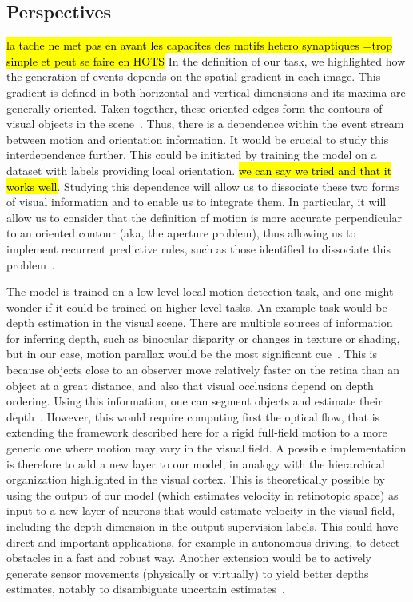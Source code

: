 \documentclass[default]{sn-jnl}%
\theoremstyle{thmstyleone}%
\theoremstyle{thmstyletwo}%
\theoremstyle{thmstylethree}%
\newcommand{\note}[1]{{\sethlcolor{yellow}\hl{#1}}}
\begin{document}
\subsection{Perspectives}
\note{la tache ne met pas en avant les capacites des motifs hetero synaptiques =trop simple et peut se faire en HOTS}
In the definition of our task, we highlighted how the generation of events depends on the spatial gradient in each image. This gradient is defined in both horizontal and vertical dimensions and its maxima are generally oriented. Taken together, these oriented edges form the contours of visual objects in the scene~\citep{koenderink_representation_1987}. Thus, there is a dependence within the event stream between motion and orientation information. It would be crucial to study this interdependence further. This could be initiated by training the model on a dataset with labels providing local orientation. \note{we can say we tried and that it works well}. Studying this dependence will allow us to dissociate these two forms of visual information and to enable us to integrate them. In particular, it will allow us to consider that the definition of motion is more accurate perpendicular to an oriented contour (aka, the aperture problem), thus allowing us to implement recurrent predictive rules, such as those identified to dissociate this problem~\citep{perrinet_motion-based_2012}.

The model is trained on a low-level local motion detection task, and one might wonder if it could be trained on higher-level tasks. An example task would be depth estimation in the visual scene. There are multiple sources of information for inferring depth, such as binocular disparity or changes in texture or shading, but in our case, motion parallax would be the most significant cue~\citep{rogers_motion_1979}. This is because objects close to an observer move relatively faster on the retina than an object at a great distance, and also that visual occlusions depend on depth ordering. Using this information, one can segment objects and estimate their depth~\citep{yoonessi_contribution_2011}. However, this would require computing first the optical flow, that is extending the framework described here for a rigid full-field motion to a more generic one where motion may vary in the visual field. A possible implementation is therefore to add a new layer to our model, in analogy with the hierarchical organization highlighted in the visual cortex. This is theoretically possible by using the output of our model (which estimates velocity in retinotopic space) as input to a new layer of neurons that would estimate velocity in the visual field, including the depth dimension in the output supervision labels. This could have direct and important applications, for example in autonomous driving, to detect obstacles in a fast and robust way. Another extension would be to actively generate sensor movements (physically or virtually) to yield better depths estimates, notably to disambiguate uncertain estimates~\citep{nawrot_eye_2003}.
\end{document}
